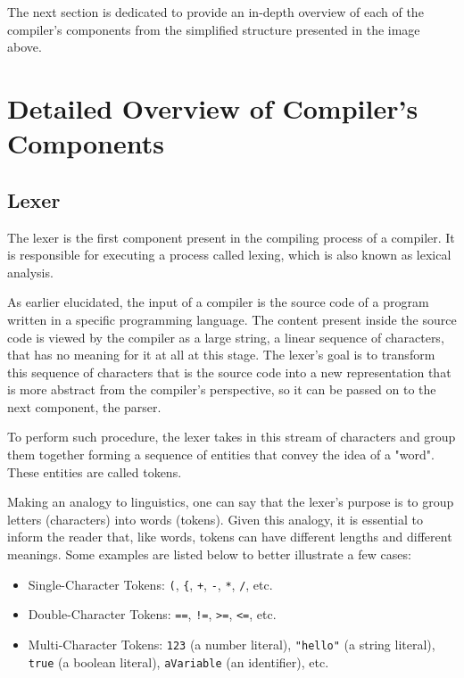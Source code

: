 The next section is dedicated to provide an in-depth overview of each of the compiler's components from the simplified structure presented in the image above.


\section{Detailed Overview of Compiler's Components}

\subsection{Lexer}
The lexer is the first component present in the compiling process of a compiler. It is responsible for executing a process called lexing, which is also known as lexical analysis.

As earlier elucidated, the input of a compiler is the source code of a program written in a specific programming language. The content present inside the source code is viewed by the compiler as a large string, a linear sequence of characters, that has no meaning for it at all at this stage. The lexer's goal is to transform this sequence of characters that is the source code into a new representation that is more abstract from the compiler's perspective, so it can be passed on to the next component, the parser.

To perform such procedure, the lexer takes in this stream of characters and group them together forming a sequence of entities that convey the idea of a "word". These entities are called tokens.

Making an analogy to linguistics, one can say that the lexer's purpose is to group letters (characters) into words (tokens). Given this analogy, it is essential to inform the reader that, like words, tokens can have different lengths and different meanings. Some examples are listed below to better illustrate a few cases:
\begin{itemize}
    \item Single-Character Tokens: \texttt{(}, \texttt{\{}, \texttt{+}, \texttt{-}, \texttt{*}, \texttt{/}, etc.
    \item Double-Character Tokens: \texttt{==}, \texttt{!=}, \texttt{>=}, \texttt{<=}, etc.
    \item Multi-Character Tokens: \texttt{123} (a number literal), \texttt{"hello"} (a string literal), \texttt{true} (a boolean literal), \texttt{aVariable} (an identifier), etc.
\end{itemize}

